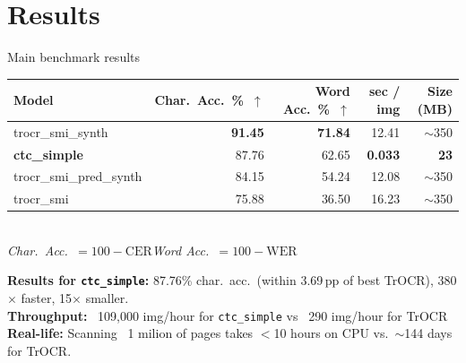 \documentclass[aspectratio=169,11pt]{beamer}
\newcommand{\trocrBestCharAcc}{91.45}
\newcommand{\trocrBestWordAcc}{71.84}
\newcommand{\trocrBestTime}{12.41}
\newcommand{\trocrSize}{350}
\newcommand{\ctcCharAcc}{87.76}
\newcommand{\ctcWordAcc}{62.65}
\newcommand{\trocrSmiPredSynthCharAcc}{84.15}   %
\newcommand{\trocrSmiPredSynthWordAcc}{54.24}   %
\newcommand{\trocrSmiCharAcc}{75.88}            %
\newcommand{\trocrSmiWordAcc}{36.50}            %
\newcommand{\ctcTime}{0.033}
\newcommand{\ctcSize}{23}
\newcommand{\speedupFactor}{380}
\newcommand{\sizeRatio}{15}
\newcommand{\cerGap}{3.69}
\newcommand{\millionPagesCtcHours}{10}
\newcommand{\millionPagesTrocrDays}{144}
\begin{document}
\section{Results}

\begin{frame}{Main benchmark results}
  \footnotesize
  \begin{table}
    \centering
    \begin{tabular}{@{}lrrrr@{}}
      \toprule
      \textbf{Model} & \textbf{Char.\ Acc.\ \%}~$\uparrow$ & \textbf{Word Acc.\ \%}~$\uparrow$ & \textbf{sec / img} & \textbf{Size (MB)} \\
      \midrule
      trocr\_smi\_synth        & \textbf{\trocrBestCharAcc}      & \textbf{\trocrBestWordAcc}      & \trocrBestTime         & $\sim$\trocrSize \\
      \textbf{ctc\_simple}     & \ctcCharAcc                      & \ctcWordAcc                      & \textbf{\ctcTime}      & \textbf{\ctcSize} \\
      trocr\_smi\_pred\_synth  & \trocrSmiPredSynthCharAcc        & \trocrSmiPredSynthWordAcc        & 12.08                  & $\sim$\trocrSize \\
      trocr\_smi               & \trocrSmiCharAcc                 & \trocrSmiWordAcc                 & 16.23                  & $\sim$\trocrSize \\
      \bottomrule
    \end{tabular}\\[2pt]
    \scriptsize\textit{Char.\ Acc.\ $= 100 - \textrm{CER}$\quad Word Acc.\ $= 100 - \textrm{WER}$}
  \end{table}
  \medskip
  \textbf{Results for \texttt{ctc\_simple}:}
  \alert{\ctcCharAcc{}\% char.\ acc.\ (within \cerGap{}\,pp of best TrOCR), \speedupFactor{}$\times$ faster, \sizeRatio{}$\times$ smaller.}\\[0.6em]
  \footnotesize 
  \textbf{Throughput:} ~109,000 img/hour for \texttt{ctc\_simple} vs ~290 img/hour for TrOCR \\
  \textbf{Real-life:} Scanning ~1 milion of pages takes \alert{$<$\millionPagesCtcHours{} hours} on CPU vs.\ $\sim$\millionPagesTrocrDays{} days for TrOCR. \\
\end{frame}
\end{document}
